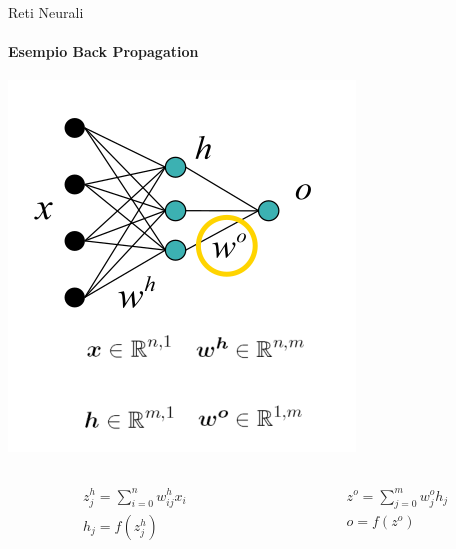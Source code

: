 \documentclass[
 ]{beamer}
\begin{document}
\begin{frame}{Reti Neurali}
    \framesubtitle{Esempio Back Propagation}
    
    \begin{center}
      \includegraphics[scale = 0.35]{back1.png}
    \end{center}
    
    \vspace{-1em}
    
    \begin{columns}
        \begin{column}{0.48\textwidth}
            \begin{equation*}
                 \begin{split}
                    & z_j^{h} = \sum_{i=0}^{n} w_{ij}^{h}x_i \\[5pt]
                    & h_j = f(z_j^{h})
                \end{split}
            \end{equation*}            
        \end{column}
        \begin{column}{0.48\textwidth}
            \begin{equation*}
                \begin{split}
                    & z^{o} = \sum_{j=0}^{m} w_{j}^{o}h_j \\[5pt]
                    & o = f(z^{o})
                \end{split}
            \end{equation*}
        \end{column}
    \end{columns}    
    
\end{frame} 
\end{document}
